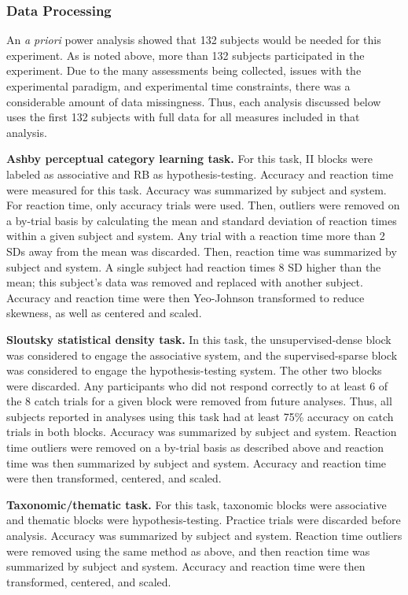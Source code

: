 \documentclass[../dissertation.tex]{subfiles}
\begin{document}
\subsubsection{Data Processing}
	An \textit{a priori} power analysis showed that 132 subjects would be needed for this experiment. As is noted above, more than 132 subjects participated in the experiment. Due to the many assessments being collected, issues with the experimental paradigm, and experimental time constraints, there was a considerable amount of data missingness. Thus, each analysis discussed below uses the first 132 subjects with full data for all measures included in that analysis. \par
	\textbf{Ashby perceptual category learning task.} For this task, II blocks were labeled as associative and RB as hypothesis-testing. Accuracy and reaction time were measured for this task. Accuracy was summarized by subject and system. For reaction time, only accuracy trials were used. Then, outliers were removed on a by-trial basis by calculating the mean and standard deviation of reaction times within a given subject and system. Any trial with a reaction time more than 2 SDs away from the mean was discarded. Then, reaction time was summarized by subject and system. A single subject had reaction times 8 SD higher than the mean; this subject's data was removed and replaced with another subject. Accuracy and reaction time were then Yeo-Johnson transformed to reduce skewness, as well as centered and scaled. \par
	\textbf{Sloutsky statistical density task.} In this task, the unsupervised-dense block was considered to engage the associative system, and the supervised-sparse block was considered to engage the hypothesis-testing system. The other two blocks were discarded. Any participants who did not respond correctly to at least 6 of the 8 catch trials for a given block were removed from future analyses. Thus, all subjects reported in analyses using this task had at least 75\% accuracy on catch trials in both blocks. Accuracy was summarized by subject and system. Reaction time outliers were removed on a by-trial basis as described above and reaction time was then summarized by subject and system. Accuracy and reaction time were then transformed, centered, and scaled. \par
	\textbf{Taxonomic/thematic task.} For this task, taxonomic blocks were associative and thematic blocks were hypothesis-testing. Practice trials were discarded before analysis. Accuracy was summarized by subject and system. Reaction time outliers were removed using the same method as above, and then reaction time was summarized by subject and system. Accuracy and reaction time were then transformed, centered, and scaled. \par
\end{document}
